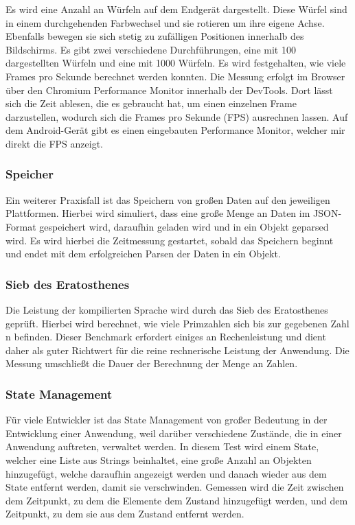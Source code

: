 Es wird eine Anzahl an Würfeln auf dem Endgerät dargestellt. Diese Würfel sind in einem durchgehenden Farbwechsel und sie rotieren um ihre eigene Achse. Ebenfalls bewegen sie sich stetig zu zufälligen Positionen innerhalb des Bildschirms. Es gibt zwei verschiedene Durchführungen, eine mit 100 dargestellten Würfeln und eine mit 1000 Würfeln. Es wird festgehalten, wie viele Frames pro Sekunde berechnet werden konnten. Die Messung erfolgt im Browser über den Chromium Performance Monitor innerhalb der DevTools. Dort lässt sich die Zeit ablesen, die es gebraucht hat, um einen einzelnen Frame darzustellen, wodurch sich die Frames pro Sekunde (FPS) ausrechnen lassen. Auf dem Android-Gerät gibt es einen eingebauten Performance Monitor, welcher mir direkt die FPS anzeigt.

\subsubsection*{Speicher}

Ein weiterer Praxisfall ist das Speichern von großen Daten auf den jeweiligen Plattformen. Hierbei wird simuliert, dass eine große Menge an Daten im JSON-Format gespeichert wird, daraufhin geladen wird und in ein Objekt geparsed wird. Es wird hierbei die Zeitmessung gestartet, sobald das Speichern beginnt und endet mit dem erfolgreichen Parsen der Daten in ein Objekt.

\subsubsection*{Sieb des Eratosthenes}

Die Leistung der kompilierten Sprache wird durch das Sieb des Eratosthenes geprüft. Hierbei wird berechnet, wie viele Primzahlen sich bis zur gegebenen Zahl n befinden. Dieser Benchmark erfordert einiges an Rechenleistung und dient daher als guter Richtwert für die reine rechnerische Leistung der Anwendung. Die Messung umschließt die Dauer der Berechnung der Menge an Zahlen.

\subsubsection*{State Management}

Für viele Entwickler ist das State Management von großer Bedeutung in der Entwicklung einer Anwendung, weil darüber verschiedene Zustände, die in einer Anwendung auftreten, verwaltet werden. In diesem Test wird einem State, welcher eine Liste aus Strings beinhaltet, eine große Anzahl an Objekten hinzugefügt, welche daraufhin angezeigt werden und danach wieder aus dem State entfernt werden, damit sie verschwinden. Gemessen wird die Zeit zwischen dem Zeitpunkt, zu dem die Elemente dem Zustand hinzugefügt werden, und dem Zeitpunkt, zu dem sie aus dem Zustand entfernt werden.

